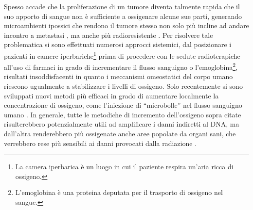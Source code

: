 \documentclass[12pt,a4paper,twoside]{report}
\begin{document}
	Spesso accade che la proliferazione di un tumore diventa talmente rapida che il suo apporto di sangue non è sufficiente a ossigenare alcune sue parti, generando microambienti ipossici che rendono il tumore stesso non solo più incline ad andare incontro a metastasi \cite{Carmeliet2011-ua}, ma anche più radioresistente \cite{Gilkes2014-rw}. Per risolvere tale problematica si sono effettuati numerosi approcci sistemici, dal posizionare i pazienti in camere iperbariche\footnote{La camera iperbarica è un luogo in cui il paziente respira un'aria ricca di ossigeno.} prima di procedere con le sedute radioterapiche all'uso di farmaci in grado di incrementare il flusso sanguigno o l'emoglobina\footnote{L'emoglobina è una proteina deputata per il trasporto di ossigeno nel sangue.}, risultati insoddisfacenti in quanto i meccanismi omeostatici del corpo umano riescono ugualmente a stabilizzare i livelli di ossigeno. Solo recentemente si sono sviluppati nuovi metodi più efficaci in grado di aumentare localmente la concentrazione di ossigeno, come l'iniezione di ``microbolle'' nel flusso sanguigno umano \cite{ox_microbubbles}. In generale, tutte le metodiche di incremento dell'ossigeno sopra citate risulterebbero potenzialmente utili ad amplificare i danni indiretti al DNA, ma dall'altra renderebbero più ossigenate anche aree popolate da organi sani, che verrebbero rese più sensibili ai danni provocati dalla radiazione \cite{ox_radiation_t}.
	
\end{document}
